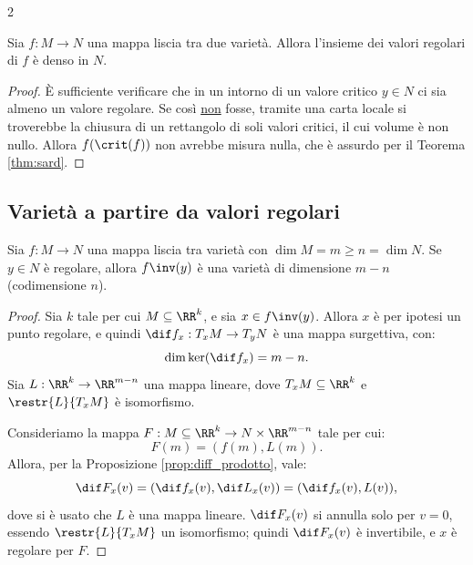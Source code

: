 \begin{multicols*}{2}
    \begin{corollary}[di Brown] \label{cor:brown} Sia $f : M \to N$ una
        mappa liscia tra due varietà. Allora l'insieme dei valori
        regolari di $f$ è denso in $N$.
    \end{corollary}

    \begin{proof}
        È sufficiente verificare che in un intorno di un valore critico $y \in N$ ci
        sia almeno un valore regolare. Se così \underline{non} fosse, tramite una carta
        locale si troverebbe la chiusura di un rettangolo di soli valori critici, il
        cui volume è non nullo. Allora $f(\crit(f))$ non avrebbe misura nulla, che
        è assurdo per il Teorema \ref{thm:sard}.
    \end{proof}

    \subsection{Varietà a partire da valori regolari}

    \begin{theorem} \label{thm:varietà_da_valore_regolare}
        Sia $f : M \to N$ una mappa liscia tra varietà con $\dim M = m \geq n = \dim N$. Se
        $y \in N$ è regolare, allora $f\inv(y)$ è una varietà di dimensione $m - n$
        \textnormal{(codimensione $n$)}.
    \end{theorem}

    \begin{proof}
        Sia $k$ tale per cui $M \subseteq \RR^k$, e sia $x \in f\inv(y)$.
        Allora $x$ è per ipotesi un punto regolare, e quindi
        $\dif f_x : T_x M \to T_y N$ è una mappa surgettiva, con:
        \[
            \dim \ker(\dif f_x) = m - n.
        \]
        Sia $L : \RR^k \to \RR^{m-n}$ una mappa lineare, dove $T_x M \subseteq \RR^k$
        e $\restr{L}{T_x M}$ è isomorfismo. \smallskip

        Consideriamo la mappa $F : M \subseteq \RR^k \to N \times \RR^{m-n}$ tale per cui:
        \[
            F(m) = (f(m), L(m)).
        \]
        Allora, per la Proposizione \ref{prop:diff_prodotto}, vale:
        \[
            \dif F_x(v) = (\dif f_x(v), \dif L_x(v)) = (\dif f_x(v), L(v)),
        \]
        dove si è usato che $L$ è una mappa lineare. $\dif F_x(v)$ si annulla solo
        per $v = 0$, essendo $\restr{L}{T_x M}$ un isomorfismo; quindi
        $\dif F_x(v)$ è invertibile, e $x$ è regolare per $F$. \smallskip


\end{proof}
\end{multicols*}
